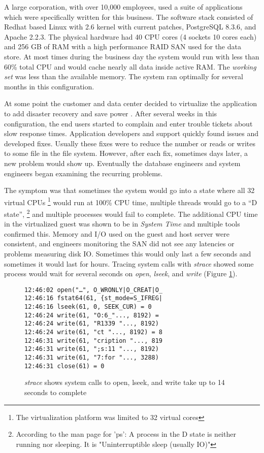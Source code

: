 A large corporation, with over 10,000 employees, used a suite of applications which were specifically written for this business. The software stack consisted of Redhat based Linux with 2.6 kernel with current patches, PostgreSQL 8.3.6, and Apache 2.2.3.  The physical hardware had 40 CPU cores (4 sockets 10 cores each) and 256 GB of RAM with a high performance RAID SAN used for the data store.  At most times during the business day the system would run with less than 60\% total CPU and would cache nearly all data inside active RAM.  The \emph{working set} was less than the available memory.  The system ran optimally for several months in this configuration.

\indent At some point the customer and data center decided to virtualize the application to add disaster recovery \cite{wood} and save power \cite{lim}.  After several weeks in this configuration, the end users started to complain and enter trouble tickets about slow response times.  Application developers and support quickly found issues and developed fixes.   Usually these fixes were to reduce the number or reads or writes to some file in the file system.  However, after each fix, sometimes days later, a new problem would show up.  Eventually the database engineers and system engineers began examining the recurring problems.

\indent The symptom was that sometimes the system would go into a state where all 32 virtual CPUs \footnote{The virtualization platform was limited to 32 virtual cores} would run at 100\% CPU time, multiple threads would go to a “D state”, \footnote{According to the man page for 'ps':  A process in the D state is neither running nor sleeping.  It is "Uninterruptible sleep (usually IO)"} and multiple processes would fail to complete.  The additional CPU time in the virtualized guest was shown to be in \emph{System Time} and multiple tools confirmed this.  Memory and I/O used on the guest and host server were consistent, and engineers monitoring the SAN did not see any latencies or problems measuring disk IO.  Sometimes this would only last a few seconds and sometimes it would last for hours.  Tracing system calls with \emph{strace} showed some process would wait for several seconds on \emph{open}, \emph{lseek}, and \emph{write} (Figure \ref{fig:syscall}).

\begin{figure}[h]
\begin{Verbatim}
12:46:02 open("…", O_WRONLY|O_CREAT|O_
12:46:16 fstat64(61, {st_mode=S_IFREG| 
12:46:16 lseek(61, 0, SEEK_CUR) = 0 
12:46:24 write(61, "O:6_"..., 8192) =  
12:46:24 write(61, "R1339 "..., 8192)  
12:46:24 write(61, "ct "..., 8192) = 8 
12:46:31 write(61, "cription "..., 819  
12:46:31 write(61, ";s:11 "..., 8192)  
12:46:31 write(61, "7:for "..., 3288)  
12:46:31 close(61) = 0
\end{Verbatim}
\caption{\emph{strace} shows system calls to open, lseek, and write take up to 14 seconds to complete}
\label{fig:syscall}
\end{figure}

